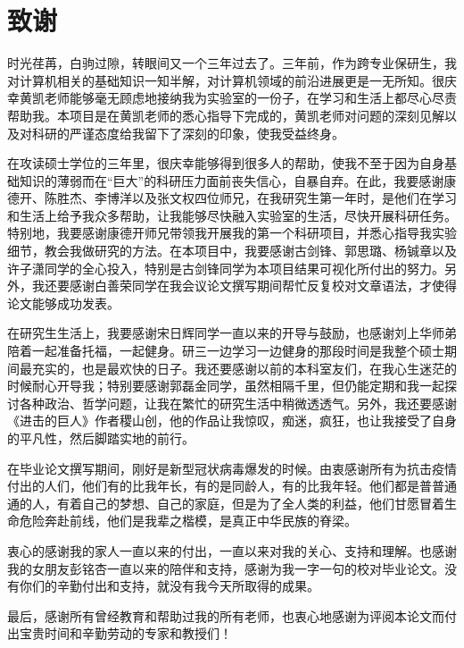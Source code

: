 

\chapter*{致\quad 谢}
时光荏苒，白驹过隙，转眼间又一个三年过去了。三年前，作为跨专业保研生，我对计算机相关的基础知识一知半解，对计算机领域的前沿进展更是一无所知。很庆幸黄凯老师能够毫无顾虑地接纳我为实验室的一份子，在学习和生活上都尽心尽责帮助我。本项目是在黄凯老师的悉心指导下完成的，黄凯老师对问题的深刻见解以及对科研的严谨态度给我留下了深刻的印象，使我受益终身。

在攻读硕士学位的三年里，很庆幸能够得到很多人的帮助，使我不至于因为自身基础知识的薄弱而在“巨大”的科研压力面前丧失信心，自暴自弃。在此，我要感谢康德开、陈胜杰、李博洋以及张文权四位师兄，在我研究生第一年时，是他们在学习和生活上给予我众多帮助，让我能够尽快融入实验室的生活，尽快开展科研任务。特别地，我要感谢康德开师兄带领我开展我的第一个科研项目，并悉心指导我实验细节，教会我做研究的方法。在本项目中，我要感谢古剑锋、郭思璐、杨铖章以及许子潇同学的全心投入，特别是古剑锋同学为本项目结果可视化所付出的努力。另外，我还要感谢白善荣同学在我会议论文撰写期间帮忙反复校对文章语法，才使得论文能够成功发表。

在研究生生活上，我要感谢宋日辉同学一直以来的开导与鼓励，也感谢刘上华师弟陪着一起准备托福，一起健身。研三一边学习一边健身的那段时间是我整个硕士期间最充实的，也是最欢快的日子。我还要感谢以前的本科室友们，在我心生迷茫的时候耐心开导我；特别要感谢郭磊金同学，虽然相隔千里，但仍能定期和我一起探讨各种政治、哲学问题，让我在繁忙的研究生活中稍微透透气。另外，我还要感谢《进击的巨人》作者稷山创，他的作品让我惊叹，痴迷，疯狂，也让我接受了自身的平凡性，然后脚踏实地的前行。

在毕业论文撰写期间，刚好是新型冠状病毒爆发的时候。由衷感谢所有为抗击疫情付出的人们，他们有的比我年长，有的是同龄人，有的比我年轻。他们都是普普通通的人，有着自己的梦想、自己的家庭，但是为了全人类的利益，他们甘愿冒着生命危险奔赴前线，他们是我辈之楷模，是真正中华民族的脊梁。

衷心的感谢我的家人一直以来的付出，一直以来对我的关心、支持和理解。也感谢我的女朋友彭铭杏一直以来的陪伴和支持，感谢为我一字一句的校对毕业论文。没有你们的辛勤付出和支持，就没有我今天所取得的成果。

最后，感谢所有曾经教育和帮助过我的所有老师，也衷心地感谢为评阅本论文而付出宝贵时间和辛勤劳动的专家和教授们！

\maketime

